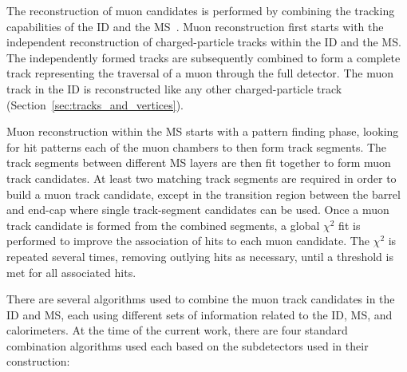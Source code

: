 The reconstruction of muon candidates is performed by combining the tracking
capabilities of the ID and the MS~\cite{Aad:2016jkr}.
Muon reconstruction first starts with the independent reconstruction of
charged-particle tracks within the ID and the MS.
The independently formed tracks are subsequently combined to form a complete
track representing the traversal of a muon through the full detector.
The muon track in the ID is reconstructed like any other charged-particle track (Section~\ref{sec:tracks_and_vertices}).

Muon reconstruction within the MS starts with a pattern finding phase, looking for
hit patterns each of the muon chambers to then form track segments.
The track segments between different MS layers are then fit together to form muon track candidates.
At least two matching track segments are required in order to build a muon
track candidate, except in the transition region between the barrel and end-cap where
single track-segment candidates can be used.
Once a muon track candidate is formed from the combined segments, a global $\chi^2$ fit is
performed to improve the association of hits to each muon candidate.
The $\chi^2$ is repeated several times, removing outlying hits as necessary, until a
threshold is met for all associated hits.

There are several algorithms used to combine the muon track candidates in the ID and MS, each
using different sets of information related to the ID, MS, and calorimeters.
At the time of the current work, there are four standard combination algorithms used
each based on the subdetectors used in their construction:

